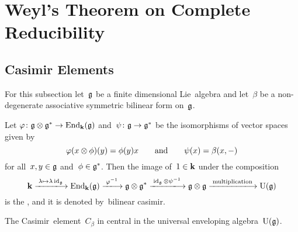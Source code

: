 \section{Weyl’s Theorem on Complete Reducibility}



\subsection{Casimir Elements}


\begin{convention}
  For this subsection let~$\mathfrak{g}$ be a finite dimensional Lie~algebra and let~$\beta$ be a non-degenerate associative symmetric bilinear form on~$\mathfrak{g}$.
\end{convention}


\begin{definition}
  \label{definition of casimir}
  Let $\varphi \colon \mathfrak{g} \otimes \mathfrak{g}^* \to \operatorname{End}_{\mathbf{k}}(\mathfrak{g})$ and~$\psi \colon \mathfrak{g} \to \mathfrak{g}^*$ be the isomorphisms of vector spaces given by
  \[
    \varphi(x \otimes \phi)(y) = \phi(y) x
    \qquad\text{and}\qquad
    \psi(x) = \beta(x, -)
  \]  
  for all~$x,y \in \mathfrak{g}$ and~$\phi \in \mathfrak{g}^*$.
  Then the image of~$1 \in \mathbf{k}$ under the composition
  \begin{equation}
    \label{casimir without coordinates}
    \kf
    \xlongto{\lambda \mapsto \lambda \id_{\glie}}
    \End_{\kf}(\glie)
    \xlongto{\varphi^{-1}}
    \glie \tensor \glie^*
    \xlongto{\id_{\glie} \tensor \psi^{-1}}
    \glie \tensor \glie
    \xlongto{\text{multiplication}}
    \Univ(\glie)
  \end{equation}
  is the , and it is denoted by~\gls*{bilinear casimir}.
\end{definition}


\begin{lemma}
  The Casimir~element~$C_\beta$ in central in the universal enveloping algebra~$\operatorname{U}(\mathfrak{g})$.
\end{lemma}


